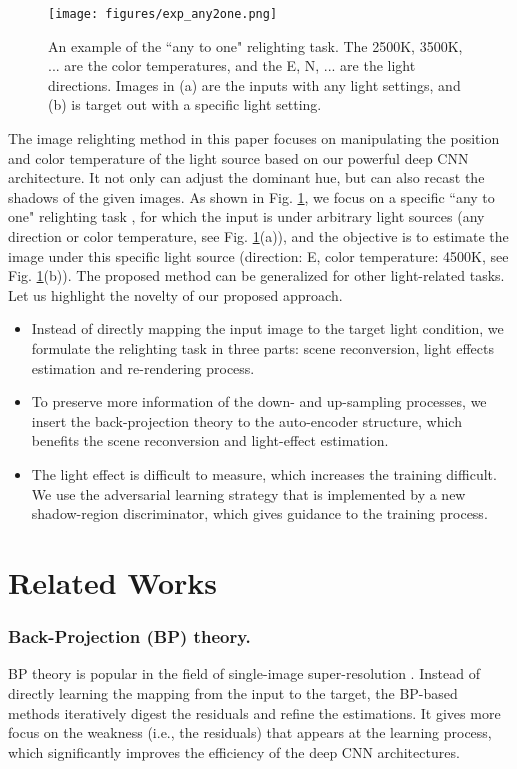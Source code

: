 \documentclass[runningheads]{llncs}
\begin{document}
\begin{figure}[t]
    \centering
    \texttt{[image: figures/exp\_any2one.png]}
   \baselineskip 
    \caption{An example of the ``any to one" relighting task. The 2500K, 3500K, ... are the color temperatures, and the E, N, ... are the light directions. Images in (a) are the inputs with any light settings, and (b) is target out with a specific light setting.}
    \label{fig:any2one}
   \baselineskip 
\end{figure}

The image relighting method in this paper focuses on manipulating the position and color temperature of the light source based on our powerful deep CNN architecture. It not only can adjust the dominant hue, but can also recast the shadows of the given images. As shown in Fig. \ref{fig:any2one}, we focus on a specific ``any to one" relighting task \cite{elhelou2020aim}, for which the input is under arbitrary light sources (any direction or color temperature, see Fig. \ref{fig:any2one}(a)), and the objective is to estimate the image under this specific light source (direction: E, color temperature: 4500K, see Fig. \ref{fig:any2one}(b)). The proposed method can be generalized for other light-related tasks. Let us highlight the novelty of our proposed approach.


\baselineskip 
\begin{itemize}
\item Instead of directly mapping the input image to the target light condition, we formulate the relighting task in three parts: scene reconversion, light effects estimation and re-rendering process. 
\item To preserve more information of the down- and up-sampling processes, we insert the back-projection theory to the auto-encoder structure, which benefits the scene reconversion and light-effect estimation.
\item The light effect is difficult to measure, which increases the training difficult. We use the adversarial learning strategy that is implemented by a new shadow-region discriminator, which gives guidance to the training process. 
\end{itemize}

\vskip -0.5cm
\baselineskip 
\section{Related Works}
\baselineskip 
\subsubsection{Back-Projection (BP) theory.}
BP theory is popular in the field of single-image super-resolution \cite{haris2018dbpn,Liu2019hbpn,Liu2019abpn}. Instead of directly learning the mapping from the input to the target, the BP-based methods iteratively digest the residuals and refine the estimations. It gives more focus on the weakness (i.e., the residuals) that appears at the learning process, which significantly improves the efficiency of the deep CNN architectures.
\end{document}
